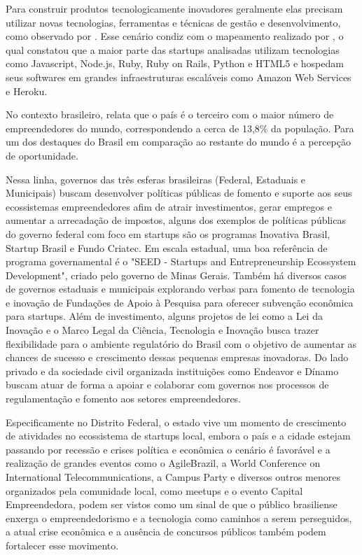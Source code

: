 Para construir produtos tecnologicamente inovadores geralmente elas precisam utilizar novas tecnologias, ferramentas e técnicas de gestão e desenvolvimento, como observado por . Esse cenário condiz com o mapeamento realizado por , o qual constatou que a maior parte das startups analisadas utilizam tecnologias como Javascript, Node.js, Ruby, Ruby on Rails, Python e HTML5 e hospedam seus softwares em grandes infraestruturas escaláveis como Amazon Web Services e Heroku. 

No contexto brasileiro,  relata que o país é o terceiro com o maior número de empreendedores do mundo, correspondendo a cerca de 13,8\% da população. Para  um dos destaques do Brasil em comparação ao restante do mundo é a percepção de oportunidade.

Nessa linha, governos das três esferas brasileiras (Federal, Estaduais e Municipais) buscam desenvolver políticas públicas de fomento e suporte aos seus ecossistemas empreendedores afim de atrair investimentos, gerar empregos e aumentar a arrecadação de impostos, alguns dos exemplos de políticas públicas do governo federal com foco em startups são os programas Inovativa Brasil, Startup Brasil e Fundo Criatec. Em escala estadual, uma boa referência de programa governamental é o "SEED - Startups and Entrepreneurship Ecossystem Development", criado pelo governo de Minas Gerais. Também há diversos casos de governos estaduais e municipais explorando verbas para fomento de tecnologia e inovação de Fundações de Apoio à Pesquisa para oferecer subvenção econômica para startups. Além de investimento, alguns projetos de lei como a Lei da Inovação e o Marco Legal da Ciência, Tecnologia e Inovação busca trazer flexibilidade para o ambiente regulatório do Brasil com o objetivo de aumentar as chances de sucesso e crescimento dessas pequenas empresas inovadoras. Do lado privado e da sociedade civil organizada instituições como Endeavor e Dínamo buscam atuar de forma a apoiar e colaborar com governos nos processos de regulamentação e fomento aos setores empreendedores.

Especificamente no Distrito Federal, o estado vive um momento de crescimento de atividades no ecossistema de startups local, embora o país e a cidade estejam passando por recessão e crises política e econômica o cenário é favorável e a realização de grandes eventos como o AgileBrazil, a World Conference on International Telecommunications, a Campus Party e diversos outros menores organizados pela comunidade local, como meetups e o evento Capital Empreendedora, podem ser vistos como um sinal de que o público brasiliense enxerga o empreendedorismo e a tecnologia como caminhos a serem perseguidos, a atual crise econômica e a ausência de concursos públicos também podem fortalecer esse movimento.

